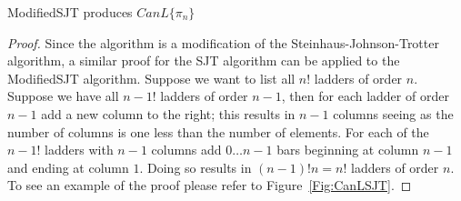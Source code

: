 \begin{lemma}
  {\sc ModifiedSJT} produces $CanL\{\pi_{n}\}$
\end{lemma}
\begin{proof}
  Since the algorithm is a modification of the Steinhaus-Johnson-Trotter algorithm, a similar proof for the SJT algorithm 
can be applied to the {\sc ModifiedSJT} algorithm. Suppose we want to list all $n!$ ladders 
of order $n$. Suppose we have all $n-1!$ ladders of order $n-1$, then for 
each ladder of order $n-1$ add a new column to the right; this results in $n-1$ columns seeing as 
the number of columns is one less than the number of elements. For each of the $n-1!$ ladders with $n-1$ columns 
add $0 \dots n-1$ bars beginning at column $n-1$ and ending 
at column $1$. Doing so results in $(n-1)!n=n!$ ladders of order $n$. To see 
an example of the proof please refer to Figure~\ref{Fig:CanLSJT}.
\end{proof}
